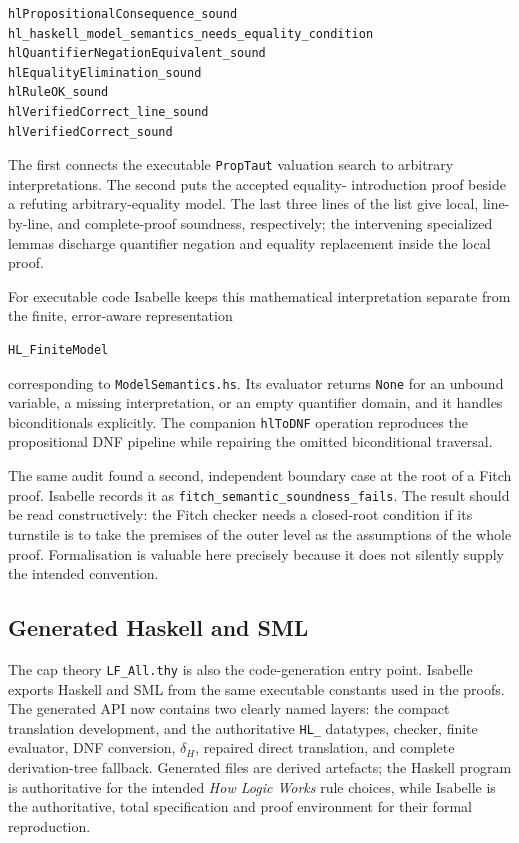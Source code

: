\documentclass[11pt]{article}
\theoremstyle{plain}
\theoremstyle{definition}
\theoremstyle{remark}
\begin{document}
\begin{lstlisting}[language={}]
hlPropositionalConsequence_sound
hl_haskell_model_semantics_needs_equality_condition
hlQuantifierNegationEquivalent_sound
hlEqualityElimination_sound
hlRuleOK_sound
hlVerifiedCorrect_line_sound
hlVerifiedCorrect_sound
\end{lstlisting}

\noindent The first connects the executable \verb|PropTaut| valuation search
to arbitrary interpretations. The second puts the accepted equality-
introduction proof beside a refuting arbitrary-equality model. The last three
lines of the list give local, line-by-line, and complete-proof soundness,
respectively; the intervening specialized lemmas discharge quantifier
negation and equality replacement inside the local proof.

For executable code Isabelle keeps this mathematical interpretation separate
from the finite, error-aware representation

\begin{lstlisting}[language={}]
HL_FiniteModel
\end{lstlisting}

\noindent corresponding to \verb|ModelSemantics.hs|. Its evaluator returns
\verb|None| for an unbound
variable, a missing interpretation, or an empty quantifier domain, and it
handles biconditionals explicitly.  The companion \verb|hlToDNF| operation
reproduces the propositional DNF pipeline while repairing the omitted
biconditional traversal.

The same audit found a second, independent boundary case at the root of a
Fitch proof. Isabelle records it as \verb|fitch_semantic_soundness_fails|.
The result should be read
constructively: the Fitch checker needs a closed-root condition if its
turnstile is to take the premises of the outer level as the assumptions of the
whole proof. Formalisation is valuable here precisely because it does not
silently supply the intended convention.

\subsection{Generated Haskell and SML}

The cap theory \verb|LF_All.thy| is also the code-generation entry point.
Isabelle exports Haskell and SML from the same executable constants used in
the proofs. The generated API now contains two clearly named layers: the
compact translation development, and the authoritative \verb|HL_| datatypes,
checker, finite evaluator, DNF conversion, $\delta_H$, repaired direct
translation, and complete derivation-tree fallback. Generated files
are derived artefacts; the Haskell program is authoritative for the intended
\emph{How Logic Works} rule choices, while Isabelle is the authoritative,
total specification and proof environment for their formal reproduction.
\end{document}
